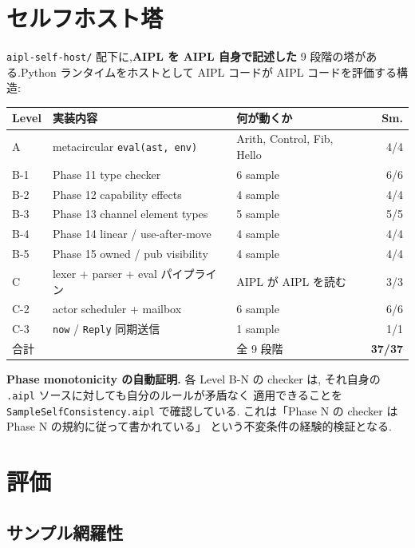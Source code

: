 \documentclass[11pt,a4paper]{article}
\newcommand{\code}[1]{\texttt{\small #1}}
\begin{document}
\section{セルフホスト塔}
\label{sec:selfhost}

\code{aipl-self-host/} 配下に,\textbf{AIPL を AIPL 自身で記述した}
9 段階の塔がある.Python ランタイムをホストとして AIPL コードが
AIPL コードを評価する構造:

\begin{tabularx}{\linewidth}{l l X r}
  \toprule
  \textbf{Level} & \textbf{実装内容} & \textbf{何が動くか} & \textbf{Sm.} \\
  \midrule
  A    & metacircular \code{eval(ast,~env)} & Arith, Control, Fib, Hello & 4/4 \\
  B-1  & Phase 11 type checker             & 6 sample          & 6/6 \\
  B-2  & Phase 12 capability effects        & 4 sample          & 4/4 \\
  B-3  & Phase 13 channel element types     & 5 sample          & 5/5 \\
  B-4  & Phase 14 linear / use-after-move   & 4 sample          & 4/4 \\
  B-5  & Phase 15 owned / pub visibility    & 4 sample          & 4/4 \\
  C    & lexer + parser + eval パイプライン  & AIPL が AIPL を読む & 3/3 \\
  C-2  & actor scheduler + mailbox          & 6 sample          & 6/6 \\
  C-3  & \code{now} / \code{Reply} 同期送信  & 1 sample          & 1/1 \\
  \midrule
  合計 & & 全 9 段階 & \textbf{37/37} \\
  \bottomrule
\end{tabularx}

\textbf{Phase monotonicity の自動証明.} 各 Level B-N の checker は,
それ自身の \code{.aipl} ソースに対しても自分のルールが矛盾なく
適用できることを \code{SampleSelfConsistency.aipl} で確認している.
これは「Phase N の checker は Phase N の規約に従って書かれている」
という不変条件の経験的検証となる.

\section{評価}
\label{sec:eval}

\subsection{サンプル網羅性}
\end{document}
